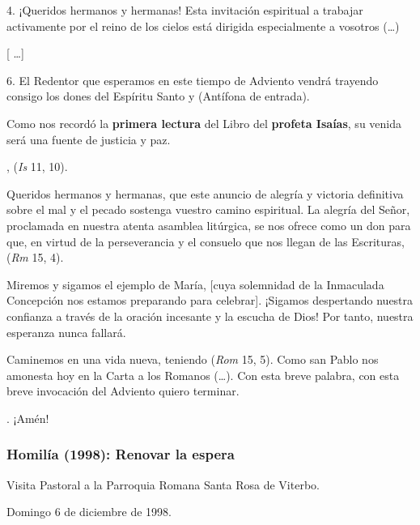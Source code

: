 \begin{body}
	4. ¡Queridos hermanos y hermanas! Esta invitación espiritual a trabajar activamente por el reino de los cielos está dirigida especialmente a vosotros (\ldots{})
	
	{[} \ldots{}{]}
	
	6. El Redentor que esperamos en este tiempo de Adviento vendrá trayendo consigo los dones del Espíritu Santo y  (Antífona de entrada).
	
	Como nos recordó la \textbf{primera lectura} del Libro del \textbf{profeta Isaías}, su venida será una fuente de justicia y paz.
	
	,  (\emph{Is} 11, 10).
	
	Queridos hermanos y hermanas, que este anuncio de alegría y victoria definitiva sobre el mal y el pecado sostenga vuestro camino espiritual. La alegría del Señor, proclamada en nuestra atenta asamblea litúrgica, se nos ofrece como un don para que, en virtud de la perseverancia y el consuelo que nos llegan de las Escrituras,  (\emph{Rm} 15, 4).
	
	Miremos y sigamos el ejemplo de María, {[}cuya solemnidad de la Inmaculada Concepción nos estamos preparando para celebrar{]}. ¡Sigamos despertando nuestra confianza a través de la oración incesante y la escucha de Dios! Por tanto, nuestra esperanza nunca fallará.
	
	Caminemos en una vida nueva, teniendo  (\emph{Rom} 15, 5). Como san Pablo nos amonesta hoy en la Carta a los Romanos (\ldots{}). Con esta breve palabra, con esta breve invocación del Adviento quiero terminar.
	
	. ¡Amén!
\end{body}

\subsubsection{Homilía (1998): Renovar la espera}

Visita Pastoral a la Parroquia Romana Santa Rosa de Viterbo.

Domingo 6 de diciembre de 1998.

